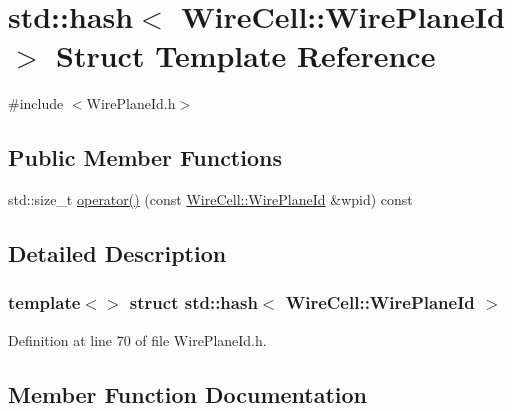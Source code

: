 \hypertarget{structstd_1_1hash_3_01_wire_cell_1_1_wire_plane_id_01_4}{}\section{std\+:\+:hash$<$ Wire\+Cell\+:\+:Wire\+Plane\+Id $>$ Struct Template Reference}
\label{structstd_1_1hash_3_01_wire_cell_1_1_wire_plane_id_01_4}


{\ttfamily \#include $<$Wire\+Plane\+Id.\+h$>$}

\subsection*{Public Member Functions}
\begin{DoxyCompactItemize}
\item 
std\+::size\+\_\+t \hyperlink{structstd_1_1hash_3_01_wire_cell_1_1_wire_plane_id_01_4_a83abe96fe67dd07c9fec1be67a95e50a}{operator()} (const \hyperlink{class_wire_cell_1_1_wire_plane_id}{Wire\+Cell\+::\+Wire\+Plane\+Id} \&wpid) const
\end{DoxyCompactItemize}


\subsection{Detailed Description}
\subsubsection*{template$<$$>$\newline
struct std\+::hash$<$ Wire\+Cell\+::\+Wire\+Plane\+Id $>$}



Definition at line 70 of file Wire\+Plane\+Id.\+h.



\subsection{Member Function Documentation}
\mbox{\label{structstd_1_1hash_3_01_wire_cell_1_1_wire_plane_id_01_4_a83abe96fe67dd07c9fec1be67a95e50a}} 
